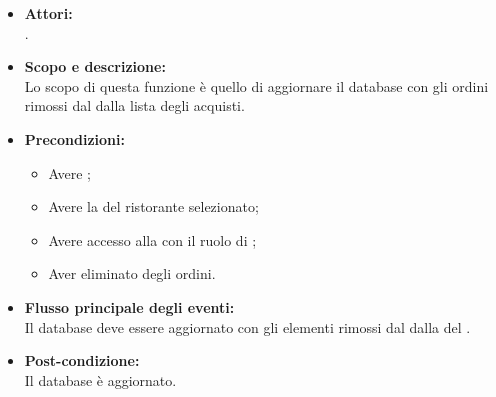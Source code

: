 \begin{itemize}
	\item \textbf{Attori:}
	\\.
	\item \textbf{Scopo e descrizione:} 
	\\Lo scopo di questa funzione è quello di aggiornare il database con gli ordini rimossi dal  dalla lista degli acquisti.
	\item \textbf{Precondizioni:}
	\begin{itemize}
		\item Avere ;
		\item Avere la  del ristorante selezionato;
		\item Avere accesso alla  con il ruolo di ;
		\item Aver eliminato degli ordini.
	\end{itemize}
	\item \textbf{Flusso principale degli eventi:}
	\\Il database deve essere aggiornato con gli elementi rimossi dal  dalla  del .
	\item \textbf{Post-condizione:}
	\\Il database è aggiornato.
\end{itemize}

